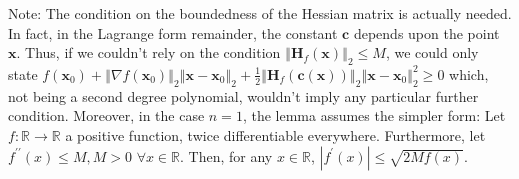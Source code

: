 \documentclass[12pt]{article}
\begin{document}
Note: The condition on the boundedness of the Hessian matrix is actually needed. In fact, in the Lagrange form remainder, the constant $\mathbf{c}$ depends upon the point $\mathbf{x}$. Thus, if we couldn't rely on the condition $\left\Vert \mathbf{H}_{f}(\mathbf{x})\right\Vert _{2}\leq M$, we could only state
$f(\mathbf{x}_{0})+\left\Vert \nabla f(\mathbf{x}_{0})\right\Vert
_{2}\left\Vert \mathbf{x}-\mathbf{x}_{0}\right\Vert _{2}+\frac{1}{2}%
\left\Vert \mathbf{H}_{f}(\mathbf{c(\mathbf{x})})\right\Vert _{2}\left\Vert \mathbf{x}-%
\mathbf{x}_{0}\right\Vert _{2}^{2}\geq 0$
which, not being a second degree polynomial, wouldn't imply any particular further condition.
Moreover, in the case $n=1$, the lemma assumes the simpler form:
Let $f:\mathbb{R}\rightarrow \mathbb{R}$ a positive function, twice differentiable everywhere.
Furthermore, let $f^{\prime \prime }(x)\leq M,M>0$ $\forall x\in \mathbb{R}$. Then,
for any $x\in \mathbb{R}$,
$\left\vert f^{\prime }(x)\right\vert \leq \sqrt{2Mf(x)}$.
\end{document}
